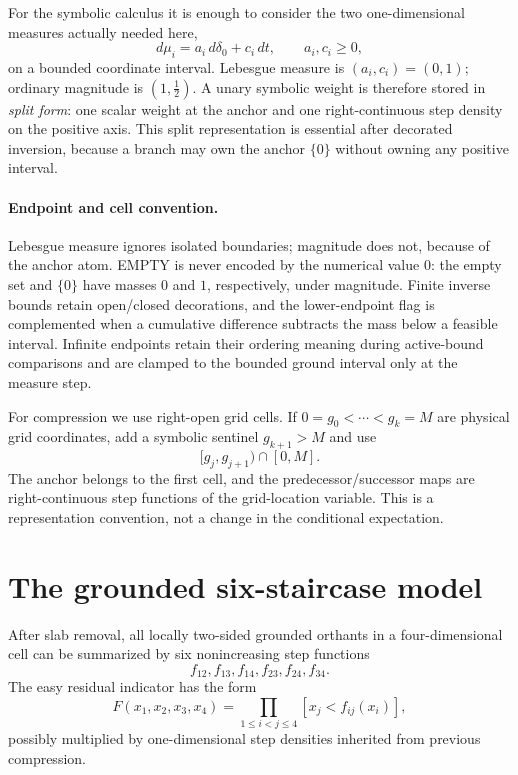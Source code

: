 \documentclass[12pt,a4paper]{article}
\theoremstyle{definition}
\newcommand{\1}{\mathbf 1}
\begin{document}
For the symbolic calculus it is enough to consider the two one-dimensional measures actually needed here,
\[
d\mu_i=a_i\,d\delta_0+c_i\,dt,
\qquad a_i,c_i\ge0,
\]
on a bounded coordinate interval. Lebesgue measure is $(a_i,c_i)=(0,1)$; ordinary magnitude is $(1,\tfrac12)$. A unary symbolic weight is therefore stored in \emph{split form}: one scalar weight at the anchor and one right-continuous step density on the positive axis. This split representation is essential after decorated inversion, because a branch may own the anchor $\{0\}$ without owning any positive interval.

\paragraph{Endpoint and cell convention.}
Lebesgue measure ignores isolated boundaries; magnitude does not, because of the anchor atom. EMPTY is never encoded by the numerical value $0$: the empty set and $\{0\}$ have masses $0$ and $1$, respectively, under magnitude. Finite inverse bounds retain open/closed decorations, and the lower-endpoint flag is complemented when a cumulative difference subtracts the mass below a feasible interval. Infinite endpoints retain their ordering meaning during active-bound comparisons and are clamped to the bounded ground interval only at the measure step.

For compression we use right-open grid cells. If $0=g_0<\cdots<g_k=M$ are physical grid coordinates, add a symbolic sentinel $g_{k+1}>M$ and use
\[
[g_j,g_{j+1})\cap[0,M].
\]
The anchor belongs to the first cell, and the predecessor/successor maps are right-continuous step functions of the grid-location variable. This is a representation convention, not a change in the conditional expectation.

\section{The grounded six-staircase model}

After slab removal, all locally two-sided grounded orthants in a four-dimensional cell can be summarized by six nonincreasing step functions
\[
f_{12},f_{13},f_{14},f_{23},f_{24},f_{34}.
\]
The easy residual indicator has the form
\begin{equation}
F(x_1,x_2,x_3,x_4)
 =\prod_{1\le i<j\le4}[x_j< f_{ij}(x_i)],                  \label{eq:six}
\end{equation}
possibly multiplied by one-dimensional step densities inherited from previous compression.
\end{document}
